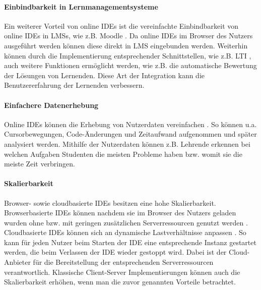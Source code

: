 \paragraph{Einbindbarkeit in Lernmanagementsysteme}
Ein weiterer Vorteil von online IDEs ist die vereinfachte Einbindbarkeit von online IDEs in \acp{LMS}, wie z.B. Moodle \cite{noauthor_moodle_nodate}. Da online IDEs im Browser des Nutzers ausgeführt werden können diese direkt in LMS eingebunden werden. Weiterhin können durch die Implementierung entsprechender Schnittstellen, wie z.B. \ac{LTI} \cite{noauthor_lti_nodate}, auch weitere Funktionen ermöglicht werden, wie z.B. die automatische Bewertung der Lösungen von Lernenden. Diese Art der Integration kann die Benutzererfahrung der Lernenden verbessern.

\paragraph{Einfachere Datenerhebung}
Online IDEs können die Erhebung von Nutzerdaten vereinfachen \cite{efopoulos_wipe_2005}\cite{singh_pyguru_nodate}\cite{helminen_recording_2013}. So können u.a. Cursorbewegungen, Code-Änderungen und Zeitaufwand aufgenommen und später analysiert werden. Mithilfe der Nutzerdaten können z.B. Lehrende erkennen bei welchen Aufgaben Studenten die meisten Probleme haben bzw. womit sie die meiste Zeit verbringen.

\paragraph{Skalierbarkeit}
Browser- sowie cloudbasierte IDEs besitzen eine hohe Skalierbarkeit. Browserbasierte IDEs können nachdem sie im Browser des Nutzers geladen wurden ohne bzw. mit geringen zusätzlichen Serverressourcen genutzt werden \cite{ball_beyond_2015}\cite{jefferson_pyodideu_2024}. Cloudbasierte IDEs können sich an dynamische Lastverhältnisse anpassen \cite{noauthor_azure-cloud-services_nodate}\cite{noauthor_ec2-autoscaling_nodate}. So kann für jeden Nutzer beim Starten der IDE eine entsprechende Instanz gestartet werden, die beim Verlassen der IDE wieder gestoppt wird. Dabei ist der Cloud-Anbieter für die Bereitstellung der entsprechenden Serverressourcen verantwortlich. Klassische Client-Server Implementierungen können auch die Skalierbarkeit erhöhen, wenn man die zuvor genannten Vorteile betrachtet.